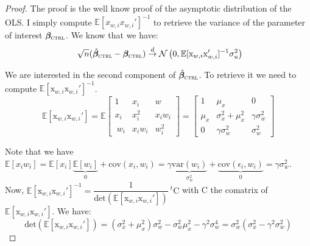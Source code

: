 \documentclass[usletter, 12pt]{article}
\begin{document}
	\begin{proof}
				The proof is the well know proof of the asymptotic distribution of the OLS. I simply compute $\mathbb{E}[x_{w, i}x_{w, i}']^{-1}$ to retrieve the variance of the parameter of interest $\bm{\beta}_{\textsc{ctrl}}$. We know that we have:
				~
				\[ \sqrt{n}(\hat{\bm{\beta}}_{\textsc{ctrl}} - \bm{\beta}_{\textsc{ctrl}}) \overset{d}{\to} 
					\mathcal{N}\left(0,  \mathbb{E}[\text{x}_{w, i}\text{x}_{w, i}']^{-1} \sigma_{u}^{2} \right) \]
			
			We are interested in the second component of $\hat{\bm{\beta}}_{\textsc{ctrl}}$. To retrieve it we need to compute $\mathbb{E}[\text{x}_{w, i}\text{x}_{w, i}']^{-1}$. 
			~
			\[ 
				\mathbb{E}[\text{x}_{w, i}\text{x}_{w, i}'] 
				= \mathbb{E} \begin{bmatrix}
					1 & x_{i} & w\\ 
					x_{i} & x_{i}^{2} & x_{i}w_{i}\\\
					w_{i} & x_{i}w_{i} & w_{i}^{2}
				\end{bmatrix} 
				=
				\begin{bmatrix}
					1 & \mu_{x} & 0\\ 
					\mu_{x} & \sigma_{x}^{2} + \mu_{x}^{2} & \gamma\sigma_{w}^{2}\\
					0 & \gamma\sigma_{w}^{2} & \sigma_{w}^{2}
				\end{bmatrix} 
				\]
				
				Note that we have $\mathbb{E}[x_{i}w_{i}] = \mathbb{E}[x_{i}]\underbrace{\mathbb{E}[w_{i}]}_{0} + \text{cov}(x_{i}, w_{i}) = \gamma  \underbrace{\text{var}(w_{i})}_{\sigma_{w}^{2}} + \underbrace{\text{cov}(\epsilon_{i}, w_{i})}_{0} = \gamma\sigma_{w}^{2}$.\\
				
				 Now, $\mathbb{E}[\text{x}_{w, i}\text{x}_{w, i}']^{-1} = \dfrac{1}{\text{det}(\mathbb{E}[\text{x}_{w, i}\text{x}_{w, i}'])}~^{t}\text{C}$ with C the comatrix of $\mathbb{E}[\text{x}_{w, i}\text{x}_{w, i}']$. We have:
				~
				\[
					\text{det}(\mathbb{E}[\text{x}_{w, i}\text{x}_{w, i}']) = (\sigma_{x}^{2} + \mu_{x}^{2})\sigma_{w}^{2} -\sigma_{w}^{2}\mu_{x}^{2} - \gamma^{2}\sigma_{w}^{4} = \sigma_{w}^{2}(\sigma_{x}^{2} - \gamma^{2}\sigma_{w}^{2})
				\]
				

\end{proof}
\end{document}

